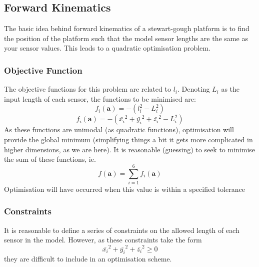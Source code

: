 \documentclass[]{article}
\newcommand\vect[1]{\bm{#1}} %
\begin{document}
	\subsection{Forward Kinematics}
	\par
		The basic idea behind forward kinematics of a stewart-gough platform is to find the position of the platform such that the model sensor lengths are the same as your sensor values. This leads to a quadratic optimisation problem.
		\subsubsection{Objective Function}
		\par
			The objective functions for this problem are related to $l_i$. Denoting $L_i$ as the input length of each sensor, the functions to be minimised are:
			$$f_i\left(\vect{a}\right) = -\left( l_i^2 - L_i^2 \right)$$
			$$f_i\left(\vect{a}\right) = -\left(\bar{x_i}^2 + \bar{y_i}^2 + \bar{z_i}^2 - L_i^2 \right)$$
			As these functions are unimodal (as quadratic functions), optimisation will provide the global minimum (simplifying things a bit \textemdash it gets more complicated in higher dimensions, as we are here).
			It is reasonable (guessing) to seek to minimise the sum of these functions, ie.
			$$f\left(\vect{a}\right) = \sum_{i=1}^6 f_i\left(\vect{a}\right)$$
			Optimisation will have occurred when this value is within a specified tolerance
		
		\subsubsection{Constraints}
		\par
			It is reasonable to define a series of constraints on the allowed length of each sensor in the model. However, as these constraints take the form
			$$\bar{x_i}^2 + \bar{y_i}^2 + \bar{z_i}^2 \geq 0$$
			they are difficult to include in an optimisation scheme. 
\end{document}
